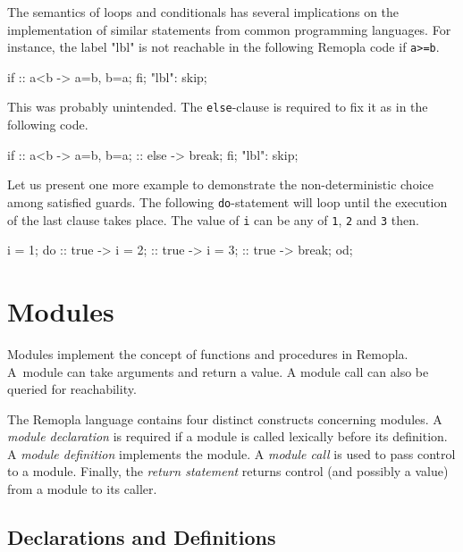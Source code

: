 \documentclass[a4paper,11pt,titlepage,english]{article}
\begin{document}
The semantics of loops and conditionals has several implications on the
implementation of similar statements from common programming languages. For
instance, the label "lbl" is not reachable in the following Remopla code if
\verb|a>=b|.
\begin{RemoplaSnippet}
    if
    :: a<b  -> a=b, b=a;
    fi;
    "lbl": skip;
\end{RemoplaSnippet}

This was probably unintended.  The \verb|else|-clause is required to fix it
as in the following code.
\begin{RemoplaSnippet}
    if
    :: a<b  -> a=b, b=a;
    :: else -> break;
    fi;
    "lbl": skip;
\end{RemoplaSnippet}

Let us present one more example to demonstrate the non-deterministic choice
among satisfied guards. The following \verb|do|-statement will loop until the
execution of the last clause takes place. The value of \verb|i| can be
any of \verb|1|, \verb|2| and \verb|3| then.
\begin{RemoplaSnippet}
    i = 1;
    do
    :: true -> i = 2;
    :: true -> i = 3;
    :: true -> break;
    od;
\end{RemoplaSnippet}


\section{Modules\label{s:modules}}

Modules implement the concept of functions and procedures in Remopla.
A~module can take arguments and return a value. A module call can also be
queried for reachability.

The Remopla language contains four distinct constructs concerning modules.
A \emph{module declaration\/} is required if a module is called lexically
before its definition. A \emph{module definition\/} implements the module.
A \emph{module call\/} is used to pass control to a module. Finally, the
\emph{return statement} returns control (and possibly a value) from
a module to its caller.

\subsection{Declarations and Definitions\label{s:modules:decl}}
\end{document}
